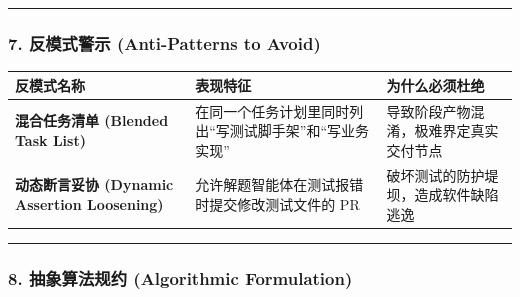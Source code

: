 \begin{center}\rule{0.5\linewidth}{0.5pt}\end{center}

\subsubsection{7. 反模式警示 (Anti-Patterns to
Avoid)}\label{ux53cdux6a21ux5f0fux8b66ux793a-anti-patterns-to-avoid-2}

{\def\LTcaptype{} %
\begin{longtable}[]{@{}
  >{\raggedright\arraybackslash}p{}
  >{\raggedright\arraybackslash}p{}
  >{\raggedright\arraybackslash}p{}@{}}
\toprule\noalign{}
\begin{minipage}[b]{\linewidth}\raggedright
反模式名称
\end{minipage} & \begin{minipage}[b]{\linewidth}\raggedright
表现特征
\end{minipage} & \begin{minipage}[b]{\linewidth}\raggedright
为什么必须杜绝
\end{minipage} \\
\midrule\noalign{}
\endhead
\bottomrule\noalign{}
\endlastfoot
\textbf{混合任务清单 (Blended Task List)} &
在同一个任务计划里同时列出``写测试脚手架''和``写业务实现'' &
导致阶段产物混淆，极难界定真实交付节点 \\
\textbf{动态断言妥协 (Dynamic Assertion Loosening)} &
允许解题智能体在测试报错时提交修改测试文件的 PR &
破坏测试的防护堤坝，造成软件缺陷逃逸 \\
\end{longtable}
}

\begin{center}\rule{0.5\linewidth}{0.5pt}\end{center}

\subsubsection{8. 抽象算法规约 (Algorithmic
Formulation)}\label{ux62bdux8c61ux7b97ux6cd5ux89c4ux7ea6-algorithmic-formulation-2}

